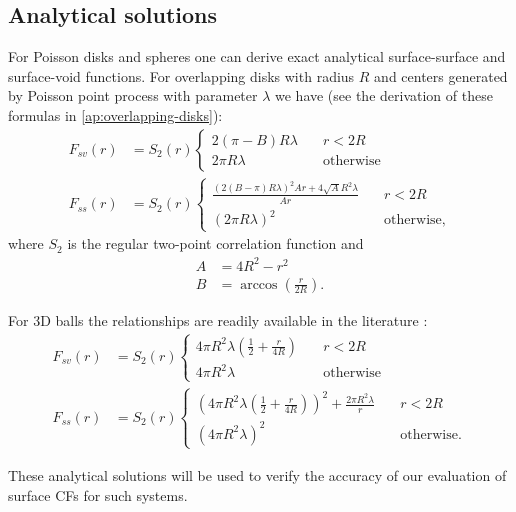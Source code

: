 \documentclass[reprint,amsmath,amssymb,aps,pre,showkeys,showpacs]{revtex4-1}
\begin{document}
\subsection{Analytical solutions}
For Poisson disks and spheres one can derive exact analytical surface-surface and
surface-void functions. For overlapping disks with radius $R$ and centers
generated by Poisson point process with parameter $\lambda$ we have (see the
derivation of these formulas in \cref{ap:overlapping-disks}):
\begin{align}
  F_{sv}(r) &= S_2(r) \left\{
  \begin{array}{ll}
    2(\pi - B)R \lambda & \quad r<2R \\
    2\pi R \lambda & \quad \text{otherwise}
  \end{array} \right. \label{eq:fsv_final} \\
  F_{ss}(r) &= S_2(r) \left\{
  \begin{array}{ll}
    \frac{(2(B-\pi)R\lambda)^2Ar + 4\sqrt{A}R^2\lambda}{Ar} & \quad r<2R \\
    (2\pi R\lambda)^2 & \quad \text{otherwise},
  \end{array} \right. \label{eq:fss_final}
\end{align}
where $S_2$ is the regular two-point correlation function and
\begin{align*}
  A &= 4R^2 - r^2 \\
  B &= \arccos(\frac{r}{2R}).
\end{align*}

For 3D balls the relationships are readily available in the literature
\cite{Torquato_book,ma2018SS}:
\begin{align*}
  F_{sv}(r) &= S_2(r) \left\{
  \begin{array}{ll}
    4\pi R^2\lambda(\frac{1}{2} + \frac{r}{4R}) & \quad r<2R \\
    4\pi R^2\lambda & \quad \text{otherwise}
  \end{array} \right. \\
  F_{ss}(r) &= S_2(r) \left\{
  \begin{array}{ll}
    {(4\pi R^2 \lambda (\frac{1}{2} + \frac{r}{4R}))^2 + \frac{2\pi R^2 \lambda}{r}} & \quad r<2R \\
    (4\pi R^2 \lambda)^2 & \quad \text{otherwise}.
  \end{array} \right.
\end{align*}

These analytical solutions will be used to verify the accuracy of our evaluation
of surface CFs for such systems.
\end{document}
